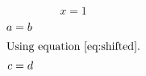 \documentclass{article}
\begin{document}
\setcounter{equation}{7}
\begin{equation}x=1\label{eq:shifted}\end{equation}
\begin{align*}a&=b\\\intertext{Using equation \eqref{eq:shifted}.}c&=d\end{align*}
\end{document}
